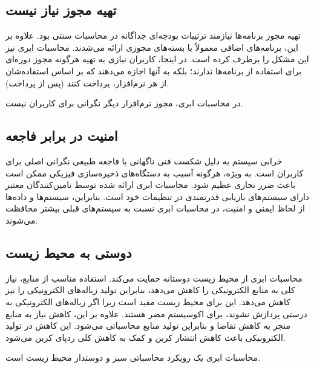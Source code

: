 \documentclass{book}
\begin{document}
    \subsection{تهیه مجوز نیاز نیست}

        تهیه مجوز برنامه‌ها نیازمند ترتیبات بودجه‌ای جداگانه در محاسبات سنتی بود. علاوه بر این، برنامه‌های اضافی معمولاً با بسته‌های مجوزی ارائه می‌شدند. محاسبات ابری نیز این مشکل را برطرف کرده است. در اینجا، کاربران نیازی به تهیه هرگونه مجوز دوره‌ای برای استفاده از برنامه‌ها ندارند؛ بلکه به آنها اجازه می‌دهند که بر اساس استفاده‌شان از هر نرم‌افزار، پرداخت کنند (پس از پرداخت).
    
    \begin{addinfo}

        در محاسبات ابری، مجوز نرم‌افزار دیگر نگرانی برای کاربران نیست.

    \end{addinfo}

    \subsection{امنیت در برابر فاجعه}

        خرابی سیستم به دلیل شکست فنی ناگهانی یا فاجعه طبیعی نگرانی اصلی برای کاربران است. به ویژه، هرگونه آسیب به دستگاه‌های ذخیره‌سازی فیزیکی ممکن است باعث ضرر تجاری عظیم شود. محاسبات ابری ارائه شده توسط تامین‌کنندگان معتبر دارای سیستم‌های بازیابی قدرتمندی در تنظیمات خود است. بنابراین، سیستم‌ها و داده‌ها از لحاظ ایمنی و امنیت، در محاسبات ابری نسبت به سیستم‌های قبلی بیشتر محافظت می‌شوند.

    \subsection{دوستی به محیط زیست}

        محاسبات ابری از محیط زیست دوستانه حمایت می‌کند. استفاده مناسب از منابع، نیاز کلی به منابع الکترونیکی را کاهش می‌دهد، بنابراین تولید زباله‌های الکترونیکی را نیز کاهش می‌دهد. این برای محیط زیست مفید است زیرا اگر زباله‌های الکترونیکی به درستی پردازش نشوند، برای اکوسیستم مضر هستند. علاوه بر این، کاهش نیاز به منابع منجر به کاهش تقاضا و بنابراین تولید منابع محاسباتی می‌شود. این کاهش در تولید الکترونیکی باعث کاهش انتشار کربن و کمک به کاهش کلی ردپای کربن می‌شود.

    \begin{addinfo}
        
        محاسبات ابری یک رویکرد محاسباتی سبز و دوستدار محیط زیست است.

    \end{addinfo}
\end{document}
